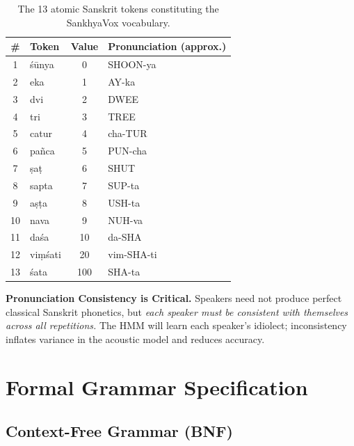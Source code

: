 \documentclass[12pt,a4paper]{article}
\begin{document}
\begin{table}[h!]
\centering
\caption{The 13 atomic Sanskrit tokens constituting the SankhyaVox vocabulary.}
\label{tab:vocab}
\begin{tabular}{@{}clcl@{}}
\toprule
\textbf{\#} & \textbf{Token} & \textbf{Value} &
\textbf{Pronunciation (approx.)} \\
\midrule
1  & \'{s}\={u}nya       & 0   & SHOON-ya \\
2  & eka                  & 1   & AY-ka \\
3  & dvi                  & 2   & DWEE \\
4  & tri                  & 3   & TREE \\
5  & catur                & 4   & cha-TUR \\
6  & pa\~{n}ca            & 5   & PUN-cha \\
7  & \d{s}a\d{t}          & 6   & SHUT \\
8  & sapta                & 7   & SUP-ta \\
9  & a\d{s}\d{t}a         & 8   & USH-ta \\
10 & nava                 & 9   & NUH-va \\
11 & da\'{s}a             & 10  & da-SHA \\
12 & vi\d{m}\'{s}ati      & 20  & vim-SHA-ti \\
13 & \'{s}ata             & 100 & SHA-ta \\
\bottomrule
\end{tabular}
\end{table}

\begin{warningbox}
\textbf{Pronunciation Consistency is Critical.}
Speakers need not produce perfect classical Sanskrit phonetics, but \emph{each
speaker must be consistent with themselves across all repetitions.}
The HMM will learn each speaker's idiolect; inconsistency inflates variance in
the acoustic model and reduces accuracy.
\end{warningbox}

\section{Formal Grammar Specification}

\subsection{Context-Free Grammar (BNF)}
\end{document}
